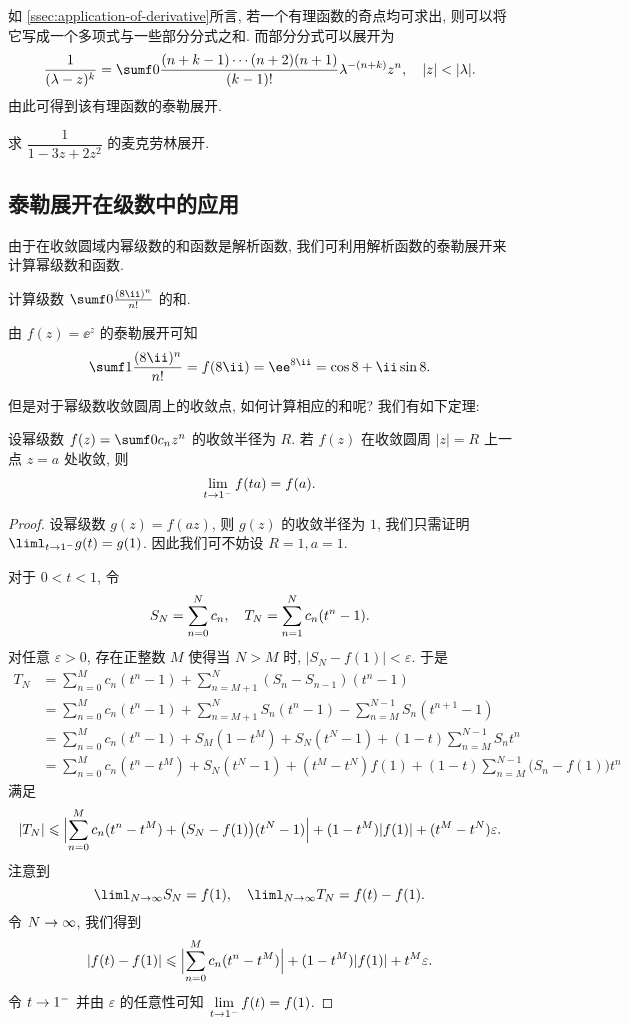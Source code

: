 如 \ref{ssec:application-of-derivative}所言, 若一个有理函数的奇点均可求出, 则可以将它写成一个多项式与一些部分分式之和.
而部分分式可以展开为
\[
   \frac1{(\lambda-z)^k}
  =\sumf0 \frac{(n+k-1)\cdots(n+2)(n+1)}{(k-1)!}\lambda^{-(n+k)}z^n,\quad |z|<|\lambda|.
\]
由此可得到该有理函数的泰勒展开.

\begin{exercise}
  求 $\dfrac1{1-3z+2z^2}$ 的麦克劳林展开.
\end{exercise}


\subsection{泰勒展开在级数中的应用}

由于在收敛圆域内幂级数的和函数是解析函数, 我们可利用解析函数的泰勒展开来计算幂级数和函数.

\begin{example}
  计算级数 $\sumf0 \frac{(8\ii)^n}{n!}$ 的和.
\end{example}

\begin{solution}
  由 $f(z)=\ee^z$ 的泰勒展开可知
  \[
     \sumf1 \frac{(8\ii)^n}{n!}
    =f(8\ii)
    =\ee^{8\ii}
    =\cos 8+\ii \sin 8.
  \]
\end{solution}

但是对于幂级数收敛圆周上的收敛点, 如何计算相应的和呢?
我们有如下定理:

\begin{theorem}[阿贝尔第二定理]
  \label{thm:abel-second}
  设幂级数 $f(z)=\sumf0 c_nz^n$ 的收敛半径为 $R$.
  若 $f(z)$ 在收敛圆周 $|z|=R$ 上一点 $z=a$ 处收敛, 则
  \[
    \lim_{t\ra 1^-}f(ta)=f(a).
  \]
\end{theorem}

\begin{proof}
  设幂级数 $g(z)=f(az)$, 则 $g(z)$ 的收敛半径为 $1$, 我们只需证明 $\liml_{t\ra 1^-} g(t)=g(1)$.
  因此我们可不妨设 $R=1,a=1$.

  对于 $0<t<1$, 令
  \[
    S_N=\suml_{n=0}^N c_n,\quad 
    T_N=\suml_{n=1}^N c_n(t^n-1).
  \]
  对任意 $\varepsilon>0$, 存在正整数 $M$ 使得当 $N>M$ 时, $|S_N-f(1)|<\varepsilon$.
  于是
  \begin{align*}
     T_N&
    =\sum_{n=0}^M c_n(t^n-1)+\sum_{n=M+1}^N(S_n-S_{n-1})(t^n-1)\\&
    =\sum_{n=0}^M c_n(t^n-1)+\sum_{n=M+1}^NS_n(t^n-1)-\sum_{n=M}^{N-1}S_n(t^{n+1}-1)\\&
    =\sum_{n=0}^M c_n(t^n-1)+S_M(1-t^M)+S_N(t^N-1)+(1-t)\sum_{n=M}^{N-1}S_nt^n\\&
    =\sum_{n=0}^M c_n(t^n-t^M)+S_N(t^N-1)+(t^M-t^N)f(1)+(1-t)\sum_{n=M}^{N-1}\bigl(S_n-f(1)\bigr)t^n
  \end{align*}
  满足
  \[
    |T_N|\le \Bigl|\sum_{n=0}^M c_n(t^n-t^M)+\bigl(S_N-f(1)\bigr)(t^N-1)\Bigr|+(1-t^M)|f(1)|+(t^M-t^N)\varepsilon.
  \]
  注意到
  \[
    \liml_{N\ra\infty} S_N=f(1),\quad \liml_{N\ra\infty} T_N=f(t)-f(1).
  \]
  令 $N\ra\infty$, 我们得到
  \[
    |f(t)-f(1)|\le \Bigl|\sum_{n=0}^M c_n(t^n-t^M)\Bigr|+(1-t^M)|f(1)|+t^M \varepsilon.
  \]
  令 $t\ra1^-$ 并由 $\varepsilon$ 的任意性可知 $\lim\limits_{t\ra 1^-}f(t)=f(1)$.
\end{proof}

